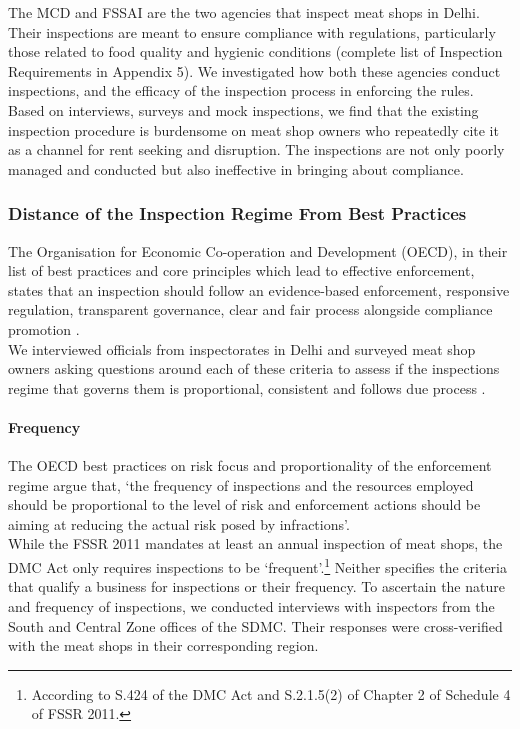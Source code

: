 \documentclass[a4paper, 12pt]{article}
\begin{document}
The MCD and FSSAI are the two agencies that inspect meat shops in Delhi. Their inspections are meant to ensure compliance with regulations, particularly those related to food quality and hygienic conditions (complete list of Inspection Requirements in Appendix 5). We investigated how both these agencies conduct inspections, and the efficacy of the inspection process in enforcing the rules. Based on interviews, surveys and mock inspections, we find that the existing inspection procedure is burdensome on meat shop owners who repeatedly cite it as a channel for rent seeking and disruption. The inspections are not only poorly managed and conducted but also ineffective in bringing about compliance. \\

\subsubsection{Distance of the Inspection Regime From Best Practices}

The Organisation for Economic Co-operation and Development (OECD), in their list of best practices and core principles which lead to effective enforcement, states that an inspection should follow an evidence-based enforcement, responsive regulation, transparent governance, clear and fair process alongside compliance promotion \parencite{oecd1report}. \\

We interviewed officials from inspectorates in Delhi and surveyed meat shop owners asking questions around each of these criteria to assess if the inspections regime that governs them is proportional, consistent and follows due process \parencite{oecd1report}. \\ 

\paragraph{Frequency}
The OECD best practices on risk focus and proportionality of the enforcement regime argue that, ‘the frequency of inspections and the resources employed should be proportional to the level of risk and enforcement actions should be aiming at reducing the actual risk posed by infractions’. \\

While the FSSR 2011 mandates at least an annual inspection of meat shops, the DMC Act only requires inspections to be ‘frequent’.\footnote{According to S.424 of the DMC Act and S.2.1.5(2) of Chapter 2 of Schedule 4 of FSSR 2011.} Neither specifies the criteria that qualify a business for inspections or their frequency. To ascertain the nature and frequency of inspections, we conducted interviews with inspectors from the South and Central Zone offices of the SDMC. Their responses were cross-verified with the meat shops in their corresponding region. \\
\end{document}
